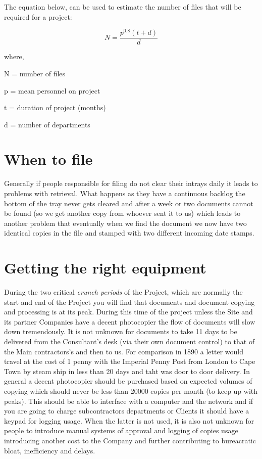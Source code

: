 The equation below, can be used to estimate the number of files that will be required for a project:



$$ N = \frac{p^{0.8}(t + d)}{d} $$

where,

N = number of files

p = mean personnel on project

t = duration of project (months)

d = number of departments




\section*{When to file}

Generally if people responsible for filing do not clear their intrays daily it leads to problems with retrieval. What happens as they have a continuous backlog the bottom of the tray never gets cleared and after a week or two documents cannot be found (so we get another copy from whoever sent it to us) which leads to another problem that eventually when we find the document we now have two identical copies in the file and 
stamped with two different incoming date stamps.

\section*{Getting the right equipment}

During the two critical \textit{crunch periods} of the Project, which are normally the start and end of the Project you will find that
documents and document copying and processing is at its peak. During this time of the project unless the Site and its partner Companies have a decent photocopier the flow of documents will slow down tremendously. It is not unknown for documents to take 11 days to be delivered from the Consultant's desk (via their own document control) to that of the Main contractors's and then to us. For comparison in 1890 a letter would travel at the cost of 1 penny with the Imperial Penny Post from London to Cape Town by steam ship in less than 20 days and taht was door to door delivery. In general a decent photocopier should be purchased based on expected volumes of copying which should never be less than 20000 copies per month (to keep up with peaks). This should be able to interface with a computer and the network and if you are going to charge subcontractors  departments or Clients it should have a keypad for logging usage. When the latter is not used, it is also not unknown for people to introduce 
manual systems of approval and logging of copies usage introducing another cost to the Company and further contributing to bureacratic bloat, inefficiency and delays. 

